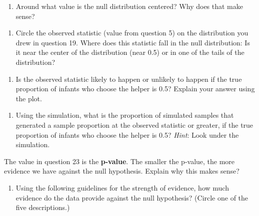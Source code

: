 \documentclass[
]{report}
\providecommand{\tightlist}{%
  \setlength{\itemsep}{0pt}\setlength{\parskip}{0pt}}
\begin{document}
\vspace{1.8in}

\begin{enumerate}
\def\labelenumi{\arabic{enumi}.}
\setcounter{enumi}{19}
\tightlist
\item
  Around what value is the null distribution centered? Why does that make sense?
\end{enumerate}

\vspace{1in}

\begin{enumerate}
\def\labelenumi{\arabic{enumi}.}
\setcounter{enumi}{20}
\tightlist
\item
  Circle the observed statistic (value from question 5) on the distribution you drew in question 19. Where does this statistic fall in the null distribution: Is it near the center of the distribution (near 0.5) or in one of the tails of the distribution?
\end{enumerate}

\vspace{1in}

\begin{enumerate}
\def\labelenumi{\arabic{enumi}.}
\setcounter{enumi}{21}
\tightlist
\item
  Is the observed statistic likely to happen or unlikely to happen if the true proportion of infants who choose the helper is 0.5? Explain your answer using the plot.
\end{enumerate}

\vspace{1in}

\begin{enumerate}
\def\labelenumi{\arabic{enumi}.}
\setcounter{enumi}{22}
\tightlist
\item
  Using the simulation, what is the proportion of simulated samples that generated a sample proportion at the observed statistic or greater, if the true proportion of infants who choose the helper is 0.5? \emph{Hint}: Look under the simulation.
\end{enumerate}

\vspace{1in}

The value in question 23 is the \textbf{p-value}. The smaller the p-value, the more evidence we have against the null hypothesis. Explain why this makes sense?

\vspace{0.5in}

\begin{enumerate}
\def\labelenumi{\arabic{enumi}.}
\setcounter{enumi}{23}
\tightlist
\item
  Using the following guidelines for the strength of evidence, how much evidence do the data provide against the null hypothesis? (Circle one of the five descriptions.)
\end{enumerate}
\end{document}
